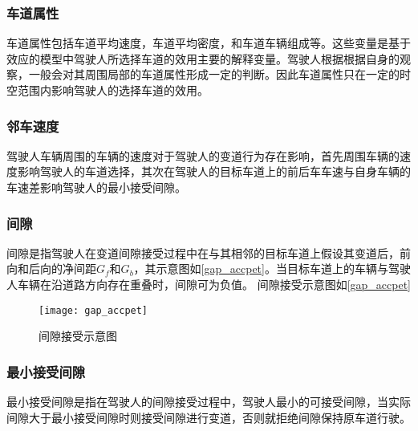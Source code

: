 
\subsubsection{车道属性}
车道属性包括车道平均速度，车道平均密度，和车道车辆组成等。这些变量是基于效应的模型中驾驶人所选择车道的效用主要的解释变量。驾驶人根据根据自身的观察，一般会对其周围局部的车道属性形成一定的判断。因此车道属性只在一定的时空范围内影响驾驶人的选择车道的效用。

\subsubsection{邻车速度}
驾驶人车辆周围的车辆的速度对于驾驶人的变道行为存在影响，首先周围车辆的速度影响驾驶人的车道选择，其次在驾驶人的目标车道上的前后车车速与自身车辆的车速差影响驾驶人的最小接受间隙。

\subsubsection{间隙}
间隙是指驾驶人在变道间隙接受过程中在与其相邻的目标车道上假设其变道后，前向和后向的净间距$G_f$和$G_b$，其示意图如\autoref{gap_accpet}。当目标车道上的车辆与驾驶人车辆在沿道路方向存在重叠时，间隙可为负值。
间隙接受示意图如\autoref{gap_accpet}
\begin{figure}[htpb]
	\centering
	\texttt{[image: gap\_accpet]}
	\caption{间隙接受示意图}
	\label{gap_accpet}
\end{figure}

\subsubsection{最小接受间隙}
最小接受间隙是指在驾驶人的间隙接受过程中，驾驶人最小的可接受间隙，当实际间隙大于最小接受间隙时则接受间隙进行变道，否则就拒绝间隙保持原车道行驶。

%

